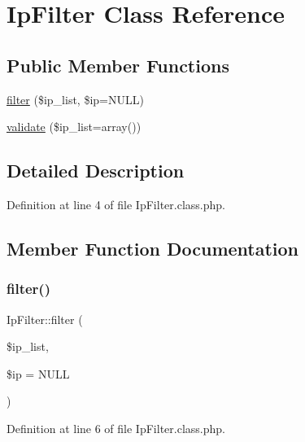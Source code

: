 \hypertarget{classIpFilter}{}\section{Ip\+Filter Class Reference}
\label{classIpFilter}
\subsection*{Public Member Functions}
\begin{DoxyCompactItemize}
\item 
\hyperlink{classIpFilter_a7952160536fa7d5dc9a762c2d122a631}{filter} (\$ip\+\_\+list, \$ip=N\+U\+LL)
\item 
\hyperlink{classIpFilter_a1efd951aad9eb58b8c394f87078299bc}{validate} (\$ip\+\_\+list=array())
\end{DoxyCompactItemize}


\subsection{Detailed Description}


Definition at line 4 of file Ip\+Filter.\+class.\+php.



\subsection{Member Function Documentation}
\mbox{\label{classIpFilter_a7952160536fa7d5dc9a762c2d122a631}} 
\subsubsection{\texorpdfstring{filter()}{filter()}}
{\footnotesize\ttfamily Ip\+Filter\+::filter (\begin{DoxyParamCaption}\item[{}]{\$ip\+\_\+list,  }\item[{}]{\$ip = {\ttfamily NULL} }\end{DoxyParamCaption})}



Definition at line 6 of file Ip\+Filter.\+class.\+php.

\mbox{\label{classIpFilter_a1efd951aad9eb58b8c394f87078299bc}} 
